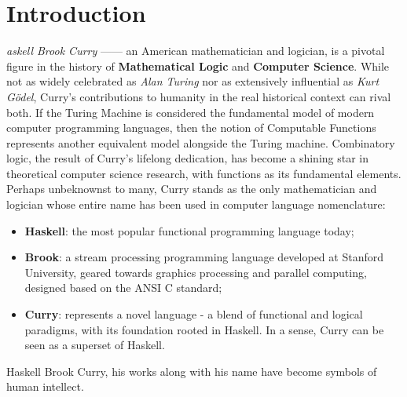 \newpage
\section{Introduction}
\lettrine[findent=2pt]{}{ }\textit{askell Brook Curry} —— an American mathematician and logician, is a pivotal figure in the history of \textbf{Mathematical Logic} and \textbf{Computer Science}. 
While not as widely celebrated as \textit{Alan Turing}\cite{alan-turing} nor as extensively influential as \textit{Kurt Gödel}\cite{godel}, Curry's contributions to humanity in the real historical context can rival both. 
If the Turing Machine\cite{turing-machine} is considered the fundamental model of modern computer programming languages, then the notion of Computable Functions\cite{computable-function} represents another equivalent model alongside the Turing machine. 
Combinatory logic\cite{combinational-logic}, the result of Curry's lifelong dedication, has become a shining star in theoretical computer science research, with functions as its fundamental elements. 
Perhaps unbeknownst to many, Curry stands as the only mathematician and logician whose entire name has been used in computer language nomenclature: 
\begin{itemize}[label={}, leftmargin=1em, itemsep=0.5em]
    \item \textbf{Haskell}: the most popular functional programming language today; 
    \item \textbf{Brook}: a stream processing programming language developed at Stanford University, geared towards graphics processing and parallel computing, designed based on the ANSI C standard; 
    \item \textbf{Curry}: represents a novel language - a blend of functional and logical paradigms, with its foundation rooted in Haskell. In a sense, Curry can be seen as a superset of Haskell. 
\end{itemize}

\noindent Haskell Brook Curry, his works along with his name have become symbols of human intellect.
